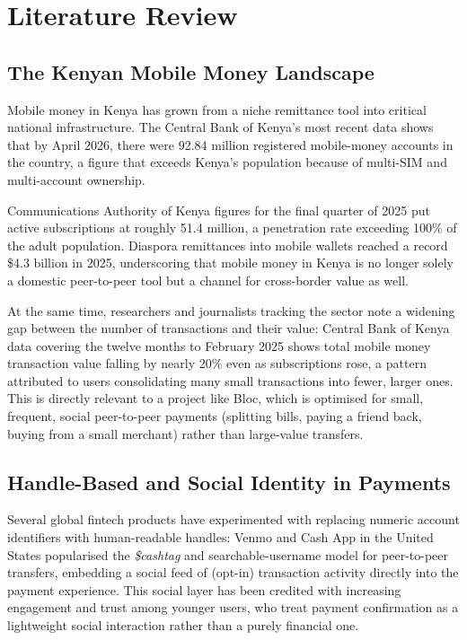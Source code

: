 \documentclass[12pt, a4paper, twoside, openright]{report}
\begin{document}
\chapter{Literature Review}

\section{The Kenyan Mobile Money Landscape}

Mobile money in Kenya has grown from a niche remittance tool into critical national infrastructure. The Central Bank of Kenya's most recent data shows that by April 2026, there were 92.84 million registered mobile-money accounts in the country, a figure that exceeds Kenya's population because of multi-SIM and multi-account ownership.

Communications Authority of Kenya figures for the final quarter of 2025 put active subscriptions at roughly 51.4 million, a penetration rate exceeding 100\% of the adult population. Diaspora remittances into mobile wallets reached a record \$4.3 billion in 2025, underscoring that mobile money in Kenya is no longer solely a domestic peer-to-peer tool but a channel for cross-border value as well.

At the same time, researchers and journalists tracking the sector note a widening gap between the number of transactions and their value: Central Bank of Kenya data covering the twelve months to February 2025 shows total mobile money transaction value falling by nearly 20\% even as subscriptions rose, a pattern attributed to users consolidating many small transactions into fewer, larger ones. This is directly relevant to a project like Bloc, which is optimised for small, frequent, social peer-to-peer payments (splitting bills, paying a friend back, buying from a small merchant) rather than large-value transfers.

\section{Handle-Based and Social Identity in Payments}

Several global fintech products have experimented with replacing numeric account identifiers with human-readable handles: Venmo and Cash App in the United States popularised the \textit{\$cashtag} and searchable-username model for peer-to-peer transfers, embedding a social feed of (opt-in) transaction activity directly into the payment experience. This social layer has been credited with increasing engagement and trust among younger users, who treat payment confirmation as a lightweight social interaction rather than a purely financial one.
\end{document}
